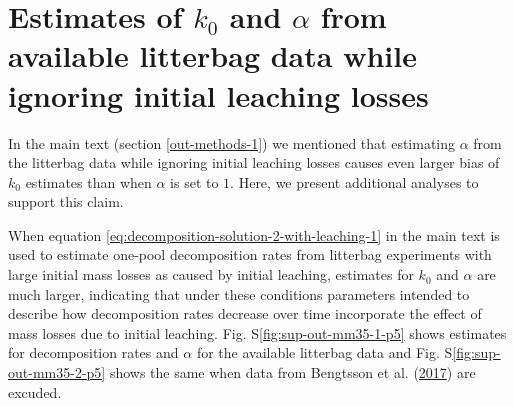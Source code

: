 \documentclass[
  12pt,
]{article}
\begin{document}
\hypertarget{sup-2}{%
\section{\texorpdfstring{Estimates of \(k_0\) and \(\alpha\) from available litterbag data while ignoring initial leaching losses}{Estimates of k\_0 and \textbackslash alpha from available litterbag data while ignoring initial leaching losses}}\label{sup-2}}

In the main text (section \ref{out-methods-1}) we mentioned that estimating \(\alpha\) from the litterbag data while ignoring initial leaching losses causes even larger bias of \(k_0\) estimates than when \(\alpha\) is set to \(1\). Here, we present additional analyses to support this claim.

When equation \eqref{eq:decomposition-solution-2-with-leaching-1} in the main text is used to estimate one-pool decomposition rates from litterbag experiments with large initial mass losses as caused by initial leaching, estimates for \(k_0\) and \(\alpha\) are much larger, indicating that under these conditions parameters intended to describe how decomposition rates decrease over time incorporate the effect of mass losses due to initial leaching. Fig. S\ref{fig:sup-out-mm35-1-p5} shows estimates for decomposition rates and \(\alpha\) for the available litterbag data and Fig. S\ref{fig:sup-out-mm35-2-p5} shows the same when data from Bengtsson et al. (\protect\hyperlink{ref-Bengtsson.2017}{2017}) are excuded.
\end{document}
